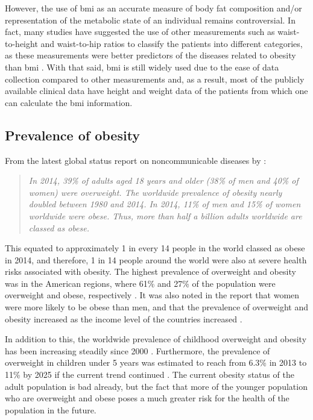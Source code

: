 However, the use of \gls{bmi} as an accurate measure of body fat composition and/or representation of the metabolic state of an individual remains controversial.
In fact, many studies have suggested the use of other measurements such as waist-to-height and waist-to-hip ratios to classify the patients into different categories, as these measurements were better predictors of the diseases related to obesity than \gls{bmi} \citep{Dalton2003,Gelber2008,Lee2008}.
With that said, \gls{bmi} is still widely used due to the ease of data collection compared to other measurements and, as a result, most of the publicly available clinical data have  height and weight data of the patients from which one can calculate the \gls{bmi} information.

\subsection{Prevalence of obesity}
\label{sub:prevalence_of_obesity}

From the latest global status report on noncommunicable diseases by \citet{WHO2014}:
\begin{quote}
	\textit{
		In 2014, 39\% of adults aged 18 years and older (38\% of men and 40\% of women) were overweight.
		The worldwide prevalence of obesity nearly doubled between 1980 and 2014.
		In 2014, 11\% of men and 15\% of women worldwide were obese.
		Thus, more than half a billion adults worldwide are classed as obese.
	}
\end{quote}

\noindent
This equated to approximately 1 in every 14 people in the world classed as obese in 2014, and therefore, 1 in 14 people around the world were also at severe health risks associated with obesity.
The highest prevalence of overweight and obesity was in the American regions, where 61\% and 27\% of the population were overweight and obese, respectively \citep{WHO2014}.
It was also noted in the report that women were more likely to be obese than men, and that the prevalence of overweight and obesity increased as the income level of the countries increased \citep{WHO2014}.

In addition to this, the worldwide prevalence of childhood overweight and obesity has been increasing steadily since 2000 \citep{WHO2014}.
Furthermore, the prevalence of overweight in children under 5 years was estimated to reach from 6.3\% in 2013 to 11\% by 2025 if the current trend continued \citep{WHO2014}.
The current obesity status of the adult population is bad already, but the fact that more of the younger population who are overweight and obese poses a much greater risk for the health of the population in the future.

